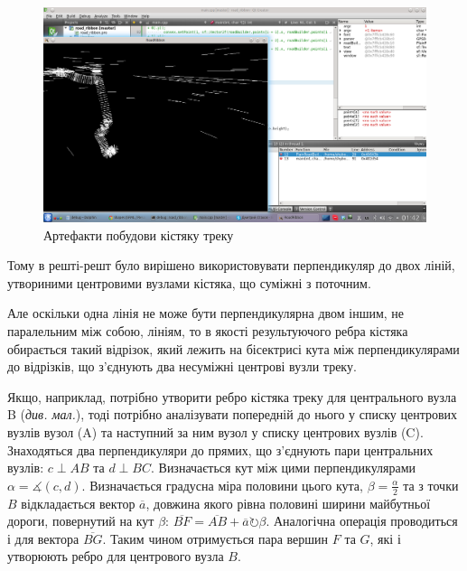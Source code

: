 \documentclass[simple,a4paper,14pt,ukrainian,utf8]{eskdtext}
\begin{document}
		\vspace{2em}
		\begin{figure}
			\centering \includegraphics[scale=0.45]{images/road2d_1.png}
			\caption{Артефакти побудови кістяку треку}
		\end{figure}
		
		Тому в решті-решт було вирішено використовувати перпендикуляр до двох ліній, утвориними центровими вузлами кістяка, що суміжні з поточним.
		
		Але оскільки одна лінія не може бути перпендикулярна двом іншим, не паралельним між собою, лініям, то в якості результуючого ребра кістяка обирається такий відрізок, який лежить на бісектрисі кута між перпендикулярами до відрізків, що з’єднують два несуміжні центрові вузли треку.
		
		Якщо, наприклад, потрібно утворити ребро кістяка треку для центрального вузла B (\textit{див. мал.}), тоді потрібно аналізувати попередній до нього у списку центрових вузлів вузол (A) та наступний за ним вузол у списку центрових вузлів (C). Знаходяться два перпендикуляри до прямих, що з’єднують пари центральних вузлів: $c \perp AB$ та $d \perp BC$. Визначається кут між цими перпендикулярами $\alpha = \measuredangle(c, d)$. Визначається градусна міра половини цього кута, $\beta = \frac{\alpha}{2}$ та з точки $B$ відкладається вектор $\overline{a}$, довжина якого рівна половині ширини майбутньої дороги, повернутий на кут $\beta$: $\overline{BF} = \overline{AB} + \overline{a} \circlearrowright \beta$. Аналогічна операція проводиться і для вектора $\overline{BG}$. Таким чином отримується пара вершин $F$ та $G$, які і утворюють ребро для центрового вузла $B$.
		
\end{document}
